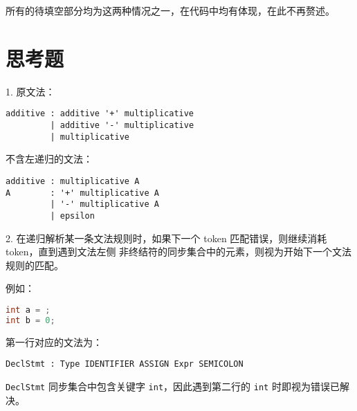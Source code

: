 \documentclass[a4paper]{article}
\begin{document}
所有的待填空部分均为这两种情况之一，在代码中均有体现，在此不再赘述。

\section{思考题}

1. 原文法：

\begin{lstlisting}
additive : additive '+' multiplicative
         | additive '-' multiplicative
         | multiplicative
\end{lstlisting}

不含左递归的文法：

\begin{lstlisting}
additive : multiplicative A
A        : '+' multiplicative A
         | '-' multiplicative A
         | epsilon
\end{lstlisting}

2. 在递归解析某一条文法规则时，如果下一个 token 匹配错误，则继续消耗 token，直到遇到文法左侧
非终结符的同步集合中的元素，则视为开始下一个文法规则的匹配。

例如：

\begin{lstlisting}[language=c++]
int a = ;
int b = 0;
\end{lstlisting}

第一行对应的文法为：

\begin{lstlisting}
DeclStmt : Type IDENTIFIER ASSIGN Expr SEMICOLON
\end{lstlisting}

\texttt{DeclStmt} 同步集合中包含关键字 \texttt{int}，因此遇到第二行的 \texttt{int} 时即视为错误已解决。
\end{document}
